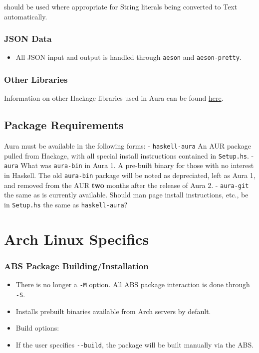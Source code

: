 \documentclass{article}
\begin{document}
should be used where appropriate for String literals being converted to
Text automatically.

\subsubsection{JSON Data}\label{json-data}

\begin{itemize}
\itemsep1pt\parskip0pt
\item
  All JSON input and output is handled through \texttt{aeson} and
  \texttt{aeson-pretty}.
\end{itemize}

\subsubsection{Other Libraries}\label{other-libraries}

Information on other Hackage libraries used in Aura can be found
\href{https://github.com/fosskers/aura/issues/223}{here}.

\subsection{Package Requirements}\label{package-requirements}

Aura must be available in the following forms: - \texttt{haskell-aura}
An AUR package pulled from Hackage, with all special install
instructions contained in \texttt{Setup.hs}. - \texttt{aura} What was
\texttt{aura-bin} in Aura 1. A pre-built binary for those with no
interest in Haskell. The old \texttt{aura-bin} package will be noted as
depreciated, left as Aura 1, and removed from the AUR \textbf{two}
months after the release of Aura 2. - \texttt{aura-git} the same as is
currently available. Should man page install instructions, etc., be in
\texttt{Setup.hs} the same as \texttt{haskell-aura}?

\section{Arch Linux Specifics}\label{arch-linux-specifics}

\subsubsection{ABS Package
Building/Installation}\label{abs-package-buildinginstallation}

\begin{itemize}
\itemsep1pt\parskip0pt
\item
  There is no longer a \texttt{-M} option. All ABS package interaction
  is done through \texttt{-S}.
\item
  Installs prebuilt binaries available from Arch servers by default.
\item
  Build options:
\item
  If the user specifies \texttt{-\/-build}, the package will be built
  manually via the ABS.
\end{itemize}
\end{document}
